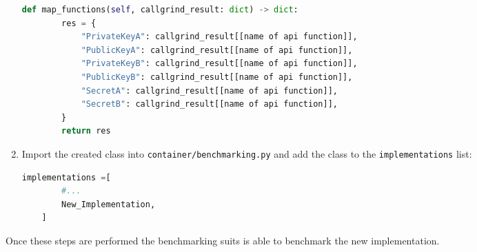 \begin{enumerate}
\begin{lstlisting}[language=Python]
    def map_functions(self, callgrind_result: dict) -> dict:
        res = {
            "PrivateKeyA": callgrind_result[[name of api function]],
            "PublicKeyA": callgrind_result[[name of api function]],
            "PrivateKeyB": callgrind_result[[name of api function]],
            "PublicKeyB": callgrind_result[[name of api function]],
            "SecretA": callgrind_result[[name of api function]],
            "SecretB": callgrind_result[[name of api function]],
        }
        return res
\end{lstlisting}
\item Import the created class into \texttt{container/benchmarking.py} and add the class to the \texttt{implementations} list:
\begin{lstlisting}[language=Python]
implementations =[
        #...
        New_Implementation,
    ]
\end{lstlisting}
\end{enumerate}
Once these steps are performed the benchmarking suits is able to benchmark the new implementation.


